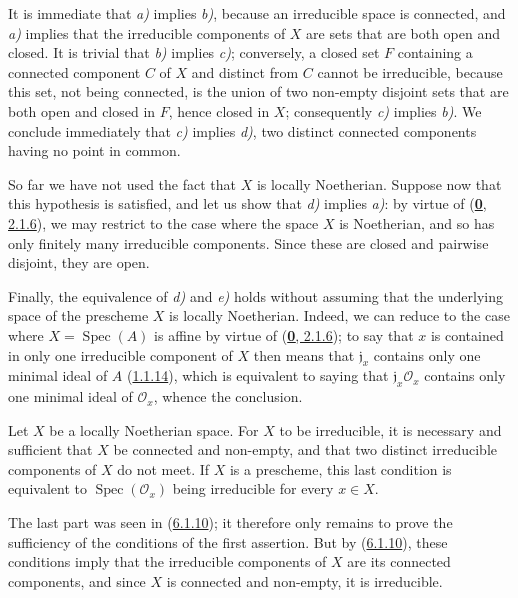 It is immediate that \emph{a)} implies \emph{b)}, because an irreducible space is connected,
and \emph{a)} implies that the irreducible components of $X$ are sets that are both
open and closed. It is trivial that \emph{b)} implies \emph{c)}; conversely, a
closed set $F$ containing
a connected component $C$ of $X$ and distinct from $C$ cannot be
irreducible, because this set, not being connected, is the union of two
non-empty disjoint sets that are both open and closed in $F$, hence
closed in $X$; consequently \emph{c)} implies \emph{b)}. We conclude immediately that \emph{c)}
implies \emph{d)}, two distinct connected components having no point in common.

So far we have not used the fact that $X$ is locally Noetherian.
Suppose now that this hypothesis is satisfied, and let us show that \emph{d)} implies
\emph{a)}: by virtue of (\hyperref[0.2.1.6]{\textbf{0}, 2.1.6}), we may restrict to the case
where the space $X$ is Noetherian, and so has only finitely many irreducible
components. Since these are closed and pairwise disjoint, they
are open.

Finally, the equivalence of \emph{d)} and \emph{e)} holds without assuming that the
underlying space of the prescheme $X$ is locally Noetherian. Indeed, we can
reduce to the case where $X=\operatorname{Spec}(A)$ is affine by virtue of
(\hyperref[0.2.1.6]{\textbf{0}, 2.1.6}); to say that $x$ is contained in only one
irreducible component of $X$ then means that $\mathfrak{j}_x$
contains only one minimal ideal of $A$ (\hyperref[I.1.1.14]{1.1.14}),
which is equivalent to saying that $\mathfrak{j}_x\mathscr{O}_x$ contains only
one minimal ideal of $\mathscr{O}_x$, whence the conclusion.

\begin{corollary}[6.1.11]
\label{I.6.1.11}
Let $X$ be a locally Noetherian space. For $X$ to be irreducible, it is
necessary and sufficient that $X$ be connected and non-empty, and that two
distinct irreducible components of $X$ do not meet. If $X$ is a
prescheme, this last condition is equivalent to
$\operatorname{Spec}(\mathscr{O}_x)$ being irreducible for every $x\in X$.
\end{corollary}

The last part was seen in (\hyperref[I.6.1.10]{6.1.10}); it therefore only
remains to prove the sufficiency of the conditions of the first assertion.
But by (\hyperref[I.6.1.10]{6.1.10}), these conditions imply that
the irreducible components of $X$ are its connected components, and since
$X$ is connected and non-empty, it is irreducible.

